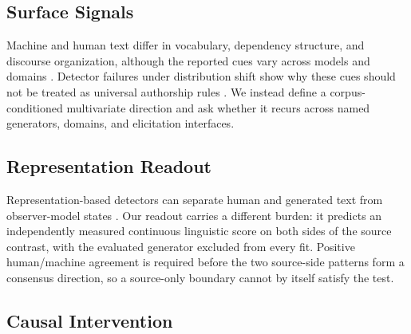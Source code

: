 \subsection{Surface Signals}

Machine and human text differ in vocabulary, dependency structure, and discourse organization, although the reported cues vary across models and domains \citep{munozortiz2024contrasting,elattar2026systematic,ahmad2026human}. Detector failures under distribution shift show why these cues should not be treated as universal authorship rules \citep{sadasivan2024detection,li-etal-2024-mage,shamardina2025coat}. We instead define a corpus-conditioned multivariate direction and ask whether it recurs across named generators, domains, and elicitation interfaces.

\subsection{Representation Readout}

Representation-based detectors can separate human and generated text from observer-model states \citep{chen-etal-2025-repreguard,vishnyakov2026svdetect}. Our readout carries a different burden: it predicts an independently measured continuous linguistic score on both sides of the source contrast, with the evaluated generator excluded from every fit. Positive human/machine agreement is required before the two source-side patterns form a consensus direction, so a source-only boundary cannot by itself satisfy the test.

\subsection{Causal Intervention}

